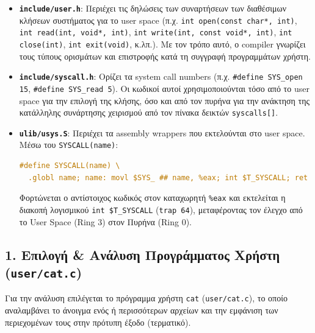 \documentclass[11pt,a4paper]{article}
\begin{document}
\begin{itemize}
    \item \textbf{\texttt{include/user.h}}: Περιέχει τις δηλώσεις των συναρτήσεων των διαθέσιμων κλήσεων συστήματος για το user space (π.χ. \texttt{int open(const char*, int)}, \texttt{int read(int, void*, int)}, \texttt{int write(int, const void*, int)}, \texttt{int close(int)}, \texttt{int exit(void)}, κ.λπ.). Με τον τρόπο αυτό, ο compiler γνωρίζει τους τύπους ορισμάτων και επιστροφής κατά τη συγγραφή προγραμμάτων χρήστη.
    
    \item \textbf{\texttt{include/syscall.h}}: Ορίζει τα system call numbers (π.χ. \texttt{\#define SYS\_open 15}, \texttt{\#define SYS\_read 5}). 
    Οι κωδικοί αυτοί χρησιμοποιούνται τόσο από το user space για την επιλογή της κλήσης, 
    όσο και από τον πυρήνα για την ανάκτηση της κατάλληλης συνάρτησης χειρισμού από τον πίνακα δεικτών \texttt{syscalls[]}.
    
    \item \textbf{\texttt{ulib/usys.S}}: Περιέχει τα assembly wrappers που εκτελούνται στο user space. 
    Μέσω του \texttt{SYSCALL(name)}:

\begin{lstlisting}[language=C, aboveskip=2pt, belowskip=2pt, basicstyle=\ttfamily\scriptsize]
#define SYSCALL(name) \
  .globl name; name: movl $SYS_ ## name, %eax; int $T_SYSCALL; ret
\end{lstlisting}
    Φορτώνεται ο αντίστοιχος κωδικός στον καταχωρητή \texttt{\%eax} και εκτελείται η διακοπή λογισμικού \texttt{int \$T\_SYSCALL} (\texttt{trap 64}), 
    μεταφέροντας τον έλεγχο από το User Space (Ring 3) στον Πυρήνα (Ring 0).
\end{itemize}

\clearpage


\subsection*{1. Επιλογή \& Ανάλυση Προγράμματος Χρήστη (\texttt{user/cat.c})}

Για την ανάλυση επιλέγεται το πρόγραμμα χρήστη \texttt{cat} (\texttt{user/cat.c}), το οποίο αναλαμβάνει το άνοιγμα ενός 
ή περισσότερων αρχείων και την εμφάνιση των περιεχομένων τους στην πρότυπη έξοδο (τερματικό).
\end{document}
